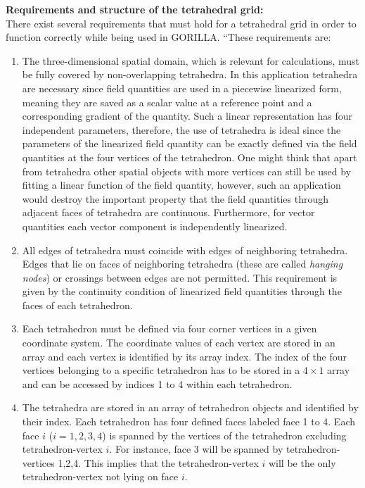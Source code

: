 \documentclass{TheMartianReport}
\begin{document}
\textbf{Requirements and structure of the tetrahedral grid:}\\
There exist several requirements that must hold for a tetrahedral grid in order to function correctly while being used in GORILLA. ``These requirements are: 

\begin{enumerate}
	\item The three-dimensional spatial domain, which is relevant for calculations, must be fully covered by non-overlapping tetrahedra. In this application tetrahedra are necessary since field quantities are used in a piecewise linearized form, meaning they are saved as a scalar value at a reference point and a corresponding gradient of the quantity. Such a linear representation has four independent parameters, therefore, the use of tetrahedra is ideal since the parameters of the linearized field quantity can be exactly defined via the field quantities at the four vertices of the tetrahedron. One might think that apart from tetrahedra other spatial objects with more vertices can still be used by fitting a linear function of the field quantity, however, such an application would destroy the important property that the field quantities through adjacent faces of tetrahedra are continuous.
	Furthermore, for vector quantities each vector component is independently linearized.
	
	
	\item All edges of tetrahedra must coincide with edges of neighboring tetrahedra. Edges that lie on faces of neighboring tetrahedra (these are called \textit{hanging nodes}) or crossings between edges are not permitted. This requirement is given by the continuity condition of linearized field quantities through the faces of each tetrahedron.
	
	\item Each tetrahedron must be defined via four corner vertices in a given coordinate system. The coordinate values of each vertex are stored in an array and each vertex is identified by its array index. The index of the four vertices belonging to a specific tetrahedron has to be stored in a $4\times1$ array and can be accessed by indices 1 to 4 within each tetrahedron.
	
	\item The tetrahedra are stored in an array of tetrahedron objects and identified by their index. Each tetrahedron has four defined faces labeled face 1 to 4. Each face $i$ ($i = 1,2,3,4$) is spanned by the vertices of the tetrahedron excluding tetrahedron-vertex $i$. For instance, face 3 will be spanned by tetrahedron-vertices 1,2,4. This implies that the tetrahedron-vertex $i$ will be the only tetrahedron-vertex not lying on face $i$.
	

\end{enumerate}
\end{document}
